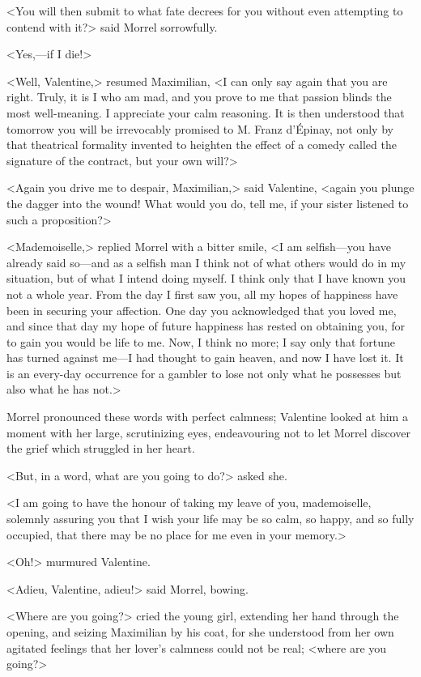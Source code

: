  <You will then submit to what fate decrees for you without even attempting to contend with it?> said Morrel sorrowfully. 

 <Yes,—if I die!> 

 <Well, Valentine,> resumed Maximilian, <I can only say again that you are right. Truly, it is I who am mad, and you prove to me that passion blinds the most well-meaning. I appreciate your calm reasoning. It is then understood that tomorrow you will be irrevocably promised to M. Franz d'Épinay, not only by that theatrical formality invented to heighten the effect of a comedy called the signature of the contract, but your own will?> 

 <Again you drive me to despair, Maximilian,> said Valentine, <again you plunge the dagger into the wound! What would you do, tell me, if your sister listened to such a proposition?> 

 <Mademoiselle,> replied Morrel with a bitter smile, <I am selfish—you have already said so—and as a selfish man I think not of what others would do in my situation, but of what I intend doing myself. I think only that I have known you not a whole year. From the day I first saw you, all my hopes of happiness have been in securing your affection. One day you acknowledged that you loved me, and since that day my hope of future happiness has rested on obtaining you, for to gain you would be life to me. Now, I think no more; I say only that fortune has turned against me—I had thought to gain heaven, and now I have lost it. It is an every-day occurrence for a gambler to lose not only what he possesses but also what he has not.> 

 Morrel pronounced these words with perfect calmness; Valentine looked at him a moment with her large, scrutinizing eyes, endeavouring not to let Morrel discover the grief which struggled in her heart. 

 <But, in a word, what are you going to do?> asked she. 

 <I am going to have the honour of taking my leave of you, mademoiselle, solemnly assuring you that I wish your life may be so calm, so happy, and so fully occupied, that there may be no place for me even in your memory.> 

 <Oh!> murmured Valentine. 

 <Adieu, Valentine, adieu!> said Morrel, bowing. 

 <Where are you going?> cried the young girl, extending her hand through the opening, and seizing Maximilian by his coat, for she understood from her own agitated feelings that her lover's calmness could not be real; <where are you going?> 

